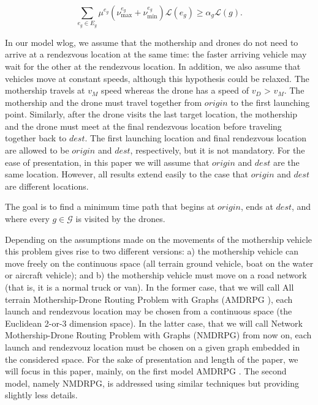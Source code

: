 \documentclass[10pt,a4paper]{article}
\def\AMD{{\sf AMDRPG \xspace }}
\def\NMD{{\sf NMDRPG\xspace}}
\newcommand{\JP}[1]{{\color{armygreen}#1}}
\newcommand{\LA}[1]{{\color{blue}#1}}
\begin{document}
\begin{equation}\label{eq:alpha-G}\tag{$\alpha$-G}
\sum_{e_g\in E_g} \mu^{e_g}(\nu_\text{max}^{e_g} + \nu_\text{min}^{e_g})\mathcal L(e_g)\geq \alpha_g\mathcal L(g).
\end{equation}

\JP{In our model wlog, we assume  that the mothership and drones do not need to arrive at a rendezvous location at the same time: the faster arriving vehicle may wait for the other at the rendezvous location. In addition, we also assume that vehicles move at constant speeds, although this hypothesis could be relaxed. The mothership travels at $v_M$ speed whereas the drone has a speed of $v_D$ > $v_M$. The mothership and the drone must travel together from $origin$ to the first launching point. Similarly, after the drone visits the last target location, the mothership and the drone must meet at the final rendezvous location before traveling together back to $dest$. The first launching location and final rendezvous location are allowed to be $origin$ and $dest$, respectively, but it is not mandatory. For the ease of presentation, in this paper we will assume that $origin$ and $dest$ are the same location. However, all results extend easily to the case that $origin$ and $dest$ are different locations.

The goal is to find a minimum time path that begins at $origin$, ends at $dest$, and where every $g \in \mathcal G$ is visited by the drones.

Depending on the assumptions made on the movements of the mothership vehicle this problem gives rise to two different versions: a) the mothership vehicle can move freely on the continuous space (all terrain ground vehicle, boat on the water or aircraft vehicle); and b) the mothership vehicle must move on a \LA{road} network (that is, it is a normal truck or van). In the former case, that we will call All terrain Mothership-Drone Routing Problem with Graphs (\AMD), each launch and rendezvous location may be chosen from a continuous space (the Euclidean 2-or-3 dimension space). In the latter case, that we will call Network Mothership-Drone Routing Problem with Graphs (\NMD) from now on, each launch and rendezvouz location must be chosen on a given graph embedded in the considered space. For the sake of presentation and length  of the paper, we will focus in this paper, mainly, on the first model \AMD. The second model, namely \NMD, is addressed using similar techniques but providing slightly less details.}
\end{document}
